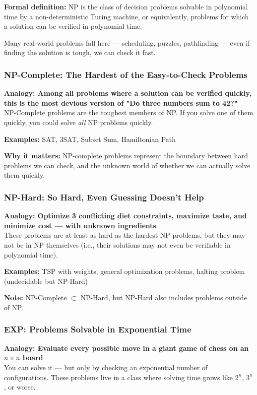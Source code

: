 \textbf{Formal definition:} NP is the class of decision problems solvable in polynomial time by a non-deterministic Turing machine, or equivalently, problems for which a solution can be verified in polynomial time.

Many real-world problems fall here — scheduling, puzzles, pathfinding — even if finding the solution is tough, we can check it fast.

\subsubsection{NP-Complete: The Hardest of the Easy-to-Check Problems}

\textbf{Analogy: Among all problems where a solution can be verified quickly, this is the most devious version of "Do three numbers sum to 42?"} \\
NP-Complete problems are the toughest members of NP. If you solve one of them quickly, you could solve \emph{all} NP problems quickly.

\textbf{Examples:} SAT, 3SAT, Subset Sum, Hamiltonian Path

\textbf{Why it matters:} NP-complete problems represent the boundary between hard problems we can check, and the unknown world of whether we can actually solve them quickly.

\subsubsection{NP-Hard: So Hard, Even Guessing Doesn’t Help}

\textbf{Analogy: Optimize 3 conflicting diet constraints, maximize taste, and minimize cost — with unknown ingredients} \\
These problems are at least as hard as the hardest NP problems, but they may not be in NP themselves (i.e., their solutions may not even be verifiable in polynomial time).

\textbf{Examples:} TSP with weights, general optimization problems, halting problem (undecidable but NP-Hard)

\textbf{Note:} NP-Complete $\subset$ NP-Hard, but NP-Hard also includes problems outside of NP.

\subsubsection{EXP: Problems Solvable in Exponential Time}

\textbf{Analogy: Evaluate every possible move in a giant game of chess on an $n \times n$ board} \\
You can solve it — but only by checking an exponential number of configurations. These problems live in a class where solving time grows like $2^n$, $3^n$, or worse.

